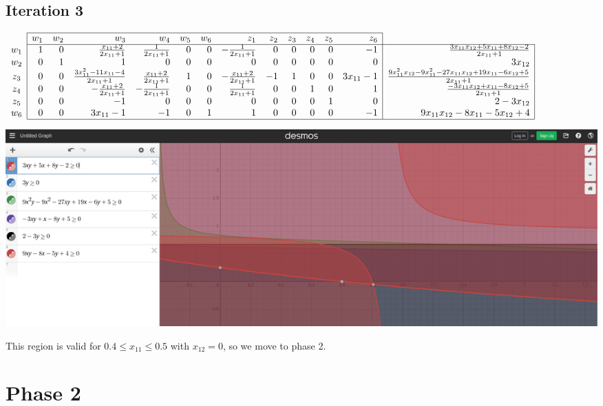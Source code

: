 \documentclass[12pt]{article}
\begin{document}
\subsection*{Iteration 3}
{\scriptsize
$\begin{array}{c|rrrrrrrrrrrr|r|}
\cline{2-13}
& w_1 & w_2 & w_3 & w_4 & w_5 & w_6 & z_1 & z_2 & z_3 & z_4 & z_5 & z_6 \\
\cline{2-14}
w_1 & 1 & 0 & \frac{x_{11} + 2}{2 x_{11} + 1} & \frac{1}{2 x_{11} + 1} & 0 & 0 & - \frac{1}{2 x_{11} + 1} & 0 & 0 & 0 & 0 & -1 & \frac{3 x_{11} x_{12} + 5 x_{11} + 8 x_{12} - 2}{2 x_{11} + 1} \\
w_2 & 0 & 1 & 1 & 0 & 0 & 0 & 0 & 0 & 0 & 0 & 0 & 0 & 3 x_{12} \\
z_3 & 0 & 0 & \frac{3 x_{11}^{2} - 11 x_{11} - 4}{2 x_{11} + 1} & \frac{x_{11} + 2}{2 x_{11} + 1} & 1 & 0 & - \frac{x_{11} + 2}{2 x_{11} + 1} & -1 & 1 & 0 & 0 & 3 x_{11} - 1 & \frac{9 x_{11}^{2} x_{12} - 9 x_{11}^{2} - 27 x_{11} x_{12} + 19 x_{11} - 6 x_{12} + 5}{2 x_{11} + 1} \\
z_4 & 0 & 0 & - \frac{x_{11} + 2}{2 x_{11} + 1} & - \frac{1}{2 x_{11} + 1} & 0 & 0 & \frac{1}{2 x_{11} + 1} & 0 & 0 & 1 & 0 & 1 & \frac{- 3 x_{11} x_{12} + x_{11} - 8 x_{12} + 5}{2 x_{11} + 1} \\
z_5 & 0 & 0 & -1 & 0 & 0 & 0 & 0 & 0 & 0 & 0 & 1 & 0 & 2 - 3 x_{12} \\
w_6 & 0 & 0 & 3 x_{11} - 1 & -1 & 0 & 1 & 1 & 0 & 0 & 0 & 0 & -1 & 9 x_{11} x_{12} - 8 x_{11} - 5 x_{12} + 4 \\
\cline{2-14}
\end{array}$
}

\begin{center}
\includegraphics[scale=.3]{Phase1_iteration3_visual}
\end{center}

This region is valid for $ 0.4 \leq x_{11} \leq 0.5 $ with $x_{12} = 0$, so we move to phase 2.

\section*{Phase 2}
\end{document}
